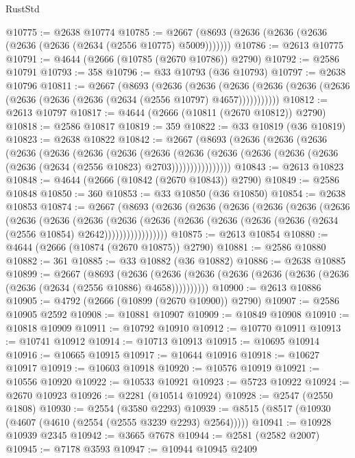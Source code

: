 \begin{lexlean}{RustStd}
\begin{coremodule}
@10775 := @2638 @10774
@10785 := @2667 (@8693 (@2636 (@2636 (@2636 (@2636 (@2636 (@2634 (@2556 @10775) @5009)))))))
@10786 := @2613 @10775
@10791 := @4644 (@2666 (@10785 (@2670 @10786)) @2790)
@10792 := @2586 @10791
@10793 := 358
@10796 := @33 @10793 (@36 @10793)
@10797 := @2638 @10796
@10811 := @2667
    (@8693
      (@2636
        (@2636
          (@2636 (@2636 (@2636 (@2636 (@2636 (@2636 (@2636 (@2634 (@2556 @10797) @4657)))))))))))
@10812 := @2613 @10797
@10817 := @4644 (@2666 (@10811 (@2670 @10812)) @2790)
@10818 := @2586 @10817
@10819 := 359
@10822 := @33 @10819 (@36 @10819)
@10823 := @2638 @10822
@10842 := @2667
    (@8693
      (@2636
        (@2636
          (@2636
            (@2636
              (@2636
                (@2636
                  (@2636
                    (@2636
                      (@2636
                        (@2636
                          (@2636 (@2636 (@2636 (@2636 (@2634 (@2556 @10823) @2703))))))))))))))))
@10843 := @2613 @10823
@10848 := @4644 (@2666 (@10842 (@2670 @10843)) @2790)
@10849 := @2586 @10848
@10850 := 360
@10853 := @33 @10850 (@36 @10850)
@10854 := @2638 @10853
@10874 := @2667
    (@8693
      (@2636
        (@2636
          (@2636
            (@2636
              (@2636
                (@2636
                  (@2636
                    (@2636
                      (@2636
                        (@2636
                          (@2636
                            (@2636 (@2636 (@2636 (@2636 (@2634 (@2556 @10854) @2642)))))))))))))))))
@10875 := @2613 @10854
@10880 := @4644 (@2666 (@10874 (@2670 @10875)) @2790)
@10881 := @2586 @10880
@10882 := 361
@10885 := @33 @10882 (@36 @10882)
@10886 := @2638 @10885
@10899 := @2667
    (@8693
      (@2636 (@2636 (@2636 (@2636 (@2636 (@2636 (@2636 (@2636 (@2634 (@2556 @10886) @4658))))))))))
@10900 := @2613 @10886
@10905 := @4792 (@2666 (@10899 (@2670 @10900)) @2790)
@10907 := @2586 @10905 @2592
@10908 := @10881 @10907
@10909 := @10849 @10908
@10910 := @10818 @10909
@10911 := @10792 @10910
@10912 := @10770 @10911
@10913 := @10741 @10912
@10914 := @10713 @10913
@10915 := @10695 @10914
@10916 := @10665 @10915
@10917 := @10644 @10916
@10918 := @10627 @10917
@10919 := @10603 @10918
@10920 := @10576 @10919
@10921 := @10556 @10920
@10922 := @10533 @10921
@10923 := @5723 @10922
@10924 := @2670 @10923
@10926 := @2281 (@10514 @10924)
@10928 := @2547 (@2550 @1808)
@10930 := @2554 (@3580 @2293)
@10939 := @8515 (@8517 (@10930 (@4607 (@4610 (@2554 (@2555 @3239 @2293) @2564)))))
@10941 := @10928 @10939 @2345
@10942 := @3665 @7678
@10944 := @2581 (@2582 @2007)
@10945 := @7178 @3593
@10947 := @10944 @10945 @2409

\end{coremodule}
\end{lexlean}
